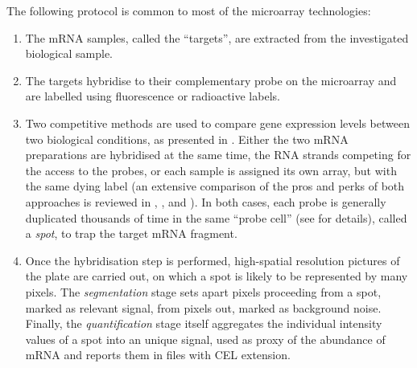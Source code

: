 The following protocol is common to most of the microarray technologies:
\begin{enumerate}
    \item The mRNA samples, called the \enquote{targets}, are extracted from the investigated biological sample. 
    \item The targets hybridise to their complementary probe on the microarray and are labelled using fluorescence or radioactive labels. 
    \item Two competitive methods are used to compare gene expression levels between two biological conditions, as presented in . Either the two mRNA preparations are hybridised at the same time, the RNA strands competing for the access to the probes, or each sample is assigned its own array, but with the same dying label (an extensive comparison of the pros and perks of both approaches is reviewed in \autocite{patterson_etal06}, \autocite{kuo_etal06}, \autocite{severgnini_etal06} and \autocite{sirbu_etal12}). In both cases, each probe is generally duplicated thousands of time in the same \enquote{probe cell} (see  for details), called a \emph{spot}, to trap the target mRNA fragment.
    \item Once the hybridisation step is performed, high-spatial resolution pictures of the plate are carried out, on which a spot is likely to be represented by many pixels. The \emph{segmentation} stage sets apart pixels proceeding from a spot, marked as relevant signal, from pixels out, marked as background noise. Finally, the \emph{quantification} stage itself aggregates the individual intensity values of a spot into an unique signal, used as proxy of the abundance of mRNA and reports them in files with CEL extension.
\end{enumerate}


